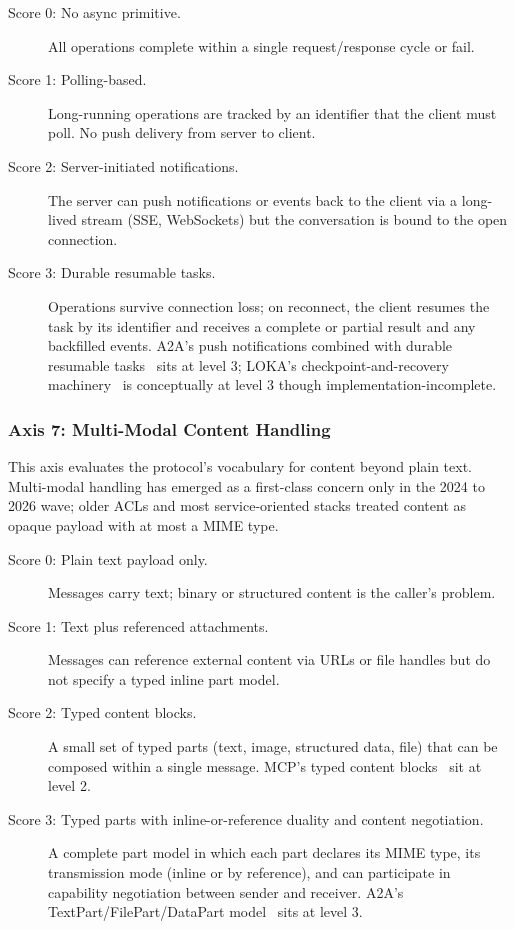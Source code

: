 \begin{description}
  \item[Score 0: No async primitive.] All operations
    complete within a single request/response cycle or
    fail.
  \item[Score 1: Polling-based.] Long-running
    operations are tracked by an identifier that the
    client must poll. No push delivery from server to
    client.
  \item[Score 2: Server-initiated notifications.]
    The server can push notifications or events back to
    the client via a long-lived stream (SSE,
    WebSockets) but the conversation is bound to the
    open connection.
  \item[Score 3: Durable resumable tasks.] Operations
    survive connection loss; on reconnect, the client
    resumes the task by its identifier and receives a
    complete or partial result and any backfilled
    events. A2A's push notifications combined with
    durable resumable tasks~\cite{spec_a2a} sits at
    level 3; LOKA's checkpoint-and-recovery
    machinery~\cite{spec_loka} is conceptually at level
    3 though implementation-incomplete.
\end{description}

\subsubsection{Axis 7: Multi-Modal Content Handling}
\label{sec:rubric:axis7}

This axis evaluates the protocol's vocabulary for content
beyond plain text. Multi-modal handling has emerged as a
first-class concern only in the 2024 to 2026 wave; older
ACLs and most service-oriented stacks treated content as
opaque payload with at most a MIME type.

\begin{description}
  \item[Score 0: Plain text payload only.] Messages
    carry text; binary or structured content is the
    caller's problem.
  \item[Score 1: Text plus referenced attachments.]
    Messages can reference external content via URLs or
    file handles but do not specify a typed inline part
    model.
  \item[Score 2: Typed content blocks.] A small set of
    typed parts (text, image, structured data, file)
    that can be composed within a single message. MCP's
    typed content blocks~\cite{spec_mcp} sit at level 2.
  \item[Score 3: Typed parts with inline-or-reference
    duality and content negotiation.] A complete part
    model in which each part declares its MIME type, its
    transmission mode (inline or by reference), and can
    participate in capability negotiation between
    sender and receiver. A2A's TextPart/FilePart/DataPart
    model~\cite{spec_a2a} sits at level 3.
\end{description}

